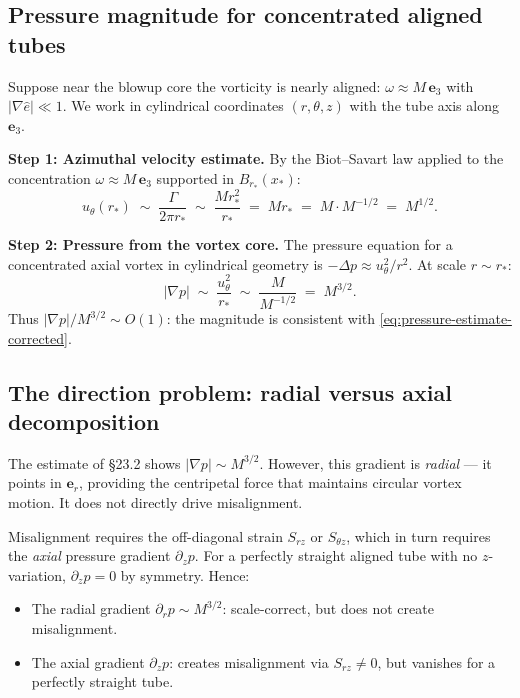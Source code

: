 \documentclass[11pt]{article}
\theoremstyle{definition}
\theoremstyle{remark}
\begin{document}
\subsection{Pressure magnitude for concentrated aligned tubes}

Suppose near the blowup core the vorticity is nearly aligned:
$\omega \approx M\,\mathbf{e}_3$ with $|\nabla\hat{e}| \ll 1$.
We work in cylindrical coordinates $(r,\theta,z)$ with the tube axis along $\mathbf{e}_3$.

\medskip\noindent
\textbf{Step 1: Azimuthal velocity estimate.}
By the Biot--Savart law applied to the concentration $\omega \approx M\,\mathbf{e}_3$
supported in $B_{r_*}(x_*)$:
\[
  u_\theta(r_*) \;\sim\; \frac{\Gamma}{2\pi r_*}
  \;\sim\; \frac{M r_*^2}{r_*} \;=\; M r_* \;=\; M \cdot M^{-1/2} \;=\; M^{1/2}.
\]

\medskip\noindent
\textbf{Step 2: Pressure from the vortex core.}
The pressure equation for a concentrated axial vortex in cylindrical geometry is
$-\Delta p \approx u_\theta^2/r^2$.
At scale $r\sim r_*$:
\[
  |\nabla p| \;\sim\; \frac{u_\theta^2}{r_*}
  \;\sim\; \frac{M}{M^{-1/2}} \;=\; M^{3/2}.
\]
Thus $|\nabla p|/M^{3/2} \sim O(1)$: the magnitude is consistent with
\eqref{eq:pressure-estimate-corrected}.

\subsection{The direction problem: radial versus axial decomposition}

The estimate of \S23.2 shows $|\nabla p| \sim M^{3/2}$.  However, this gradient is
\emph{radial} — it points in $\mathbf{e}_r$, providing the centripetal force that
maintains circular vortex motion.  It does not directly drive misalignment.

Misalignment requires the off-diagonal strain $S_{rz}$ or $S_{\theta z}$, which
in turn requires the \emph{axial} pressure gradient $\partial_z p$.  For a
perfectly straight aligned tube with no $z$-variation, $\partial_z p = 0$ by
symmetry.  Hence:
\begin{itemize}
  \item The radial gradient $\partial_r p \sim M^{3/2}$:
        scale-correct, but does not create misalignment.
  \item The axial gradient $\partial_z p$:
        creates misalignment via $S_{rz} \ne 0$, but vanishes for a
        perfectly straight tube.
\end{itemize}
\end{document}
